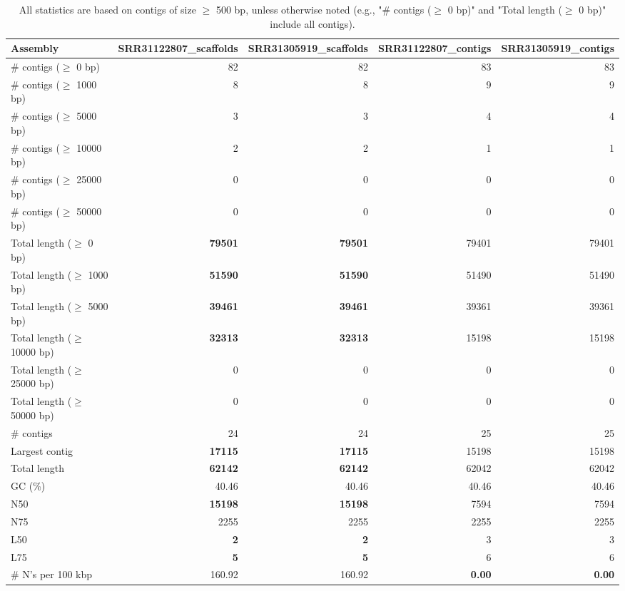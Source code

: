 \documentclass[12pt,a4paper]{article}
\begin{document}
\begin{table}[ht]
\begin{center}
\caption{All statistics are based on contigs of size $\geq$ 500 bp, unless otherwise noted (e.g., "\# contigs ($\geq$ 0 bp)" and "Total length ($\geq$ 0 bp)" include all contigs).}
\begin{tabular}{|l*{4}{|r}|}
\hline
Assembly & SRR31122807\_scaffolds & SRR31305919\_scaffolds & SRR31122807\_contigs & SRR31305919\_contigs \\ \hline
\# contigs ($\geq$ 0 bp) & 82 & 82 & 83 & 83 \\ \hline
\# contigs ($\geq$ 1000 bp) & 8 & 8 & 9 & 9 \\ \hline
\# contigs ($\geq$ 5000 bp) & 3 & 3 & 4 & 4 \\ \hline
\# contigs ($\geq$ 10000 bp) & 2 & 2 & 1 & 1 \\ \hline
\# contigs ($\geq$ 25000 bp) & 0 & 0 & 0 & 0 \\ \hline
\# contigs ($\geq$ 50000 bp) & 0 & 0 & 0 & 0 \\ \hline
Total length ($\geq$ 0 bp) & {\bf 79501} & {\bf 79501} & 79401 & 79401 \\ \hline
Total length ($\geq$ 1000 bp) & {\bf 51590} & {\bf 51590} & 51490 & 51490 \\ \hline
Total length ($\geq$ 5000 bp) & {\bf 39461} & {\bf 39461} & 39361 & 39361 \\ \hline
Total length ($\geq$ 10000 bp) & {\bf 32313} & {\bf 32313} & 15198 & 15198 \\ \hline
Total length ($\geq$ 25000 bp) & 0 & 0 & 0 & 0 \\ \hline
Total length ($\geq$ 50000 bp) & 0 & 0 & 0 & 0 \\ \hline
\# contigs & 24 & 24 & 25 & 25 \\ \hline
Largest contig & {\bf 17115} & {\bf 17115} & 15198 & 15198 \\ \hline
Total length & {\bf 62142} & {\bf 62142} & 62042 & 62042 \\ \hline
GC (\%) & 40.46 & 40.46 & 40.46 & 40.46 \\ \hline
N50 & {\bf 15198} & {\bf 15198} & 7594 & 7594 \\ \hline
N75 & 2255 & 2255 & 2255 & 2255 \\ \hline
L50 & {\bf 2} & {\bf 2} & 3 & 3 \\ \hline
L75 & {\bf 5} & {\bf 5} & 6 & 6 \\ \hline
\# N's per 100 kbp & 160.92 & 160.92 & {\bf 0.00} & {\bf 0.00} \\ \hline
\end{tabular}
\end{center}
\end{table}
\end{document}
